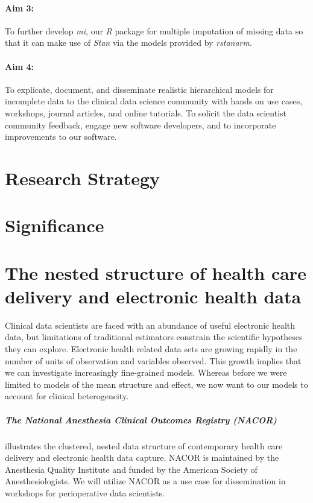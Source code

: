 \documentclass[11pt,notitlepage]{article}
\begin{document}
\paragraph*{Aim 3:} To further develop \textit{mi}, our \textit{R} package for multiple imputation
of missing data so that it can make use of \textit{Stan} via the models provided by \textit{rstanarm}.

\paragraph*{Aim 4:} To explicate, document, and disseminate realistic hierarchical 
models for incomplete data to the clinical data science community with hands on use cases, workshops, journal articles, and 
online tutorials. To solicit the data scientist community feedback, engage new 
software developers, and to incorporate improvements to our software.

\section*{Research Strategy}

\section*{Significance}

\section*{The nested structure of health care delivery and electronic health data}
Clinical data scientists are faced with an abundance of useful electronic health data, 
but limitations of traditional estimators constrain the scientific hypotheses they can explore. 
Electronic health related data sets are growing rapidly in the number of units of observation and 
variables observed. This growth implies that we can investigate increasingly fine-grained 
models. Whereas before we were limited to models of the mean structure and effect, we 
now want to our models to account for clinical heterogeneity.

\subparagraph*{The National Anesthesia Clinical Outcomes Registry (NACOR)} illustrates 
the clustered, nested data structure of contemporary health  care delivery and electronic health data capture. 
NACOR is maintained by the Anesthesia Quality Institute and funded by the American Society of 
Anesthesiologists. We will utilize NACOR as a use case for dissemination in workshops for perioperative data scientists.
\end{document}
